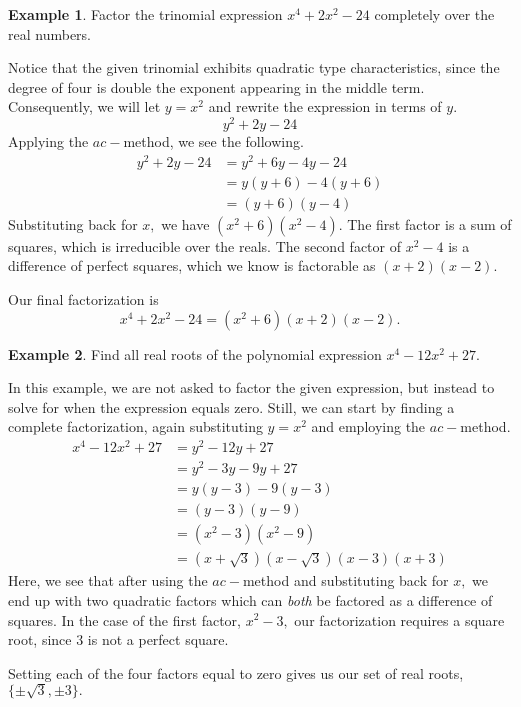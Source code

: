 \documentclass[12pt]{book}
\theoremstyle{definition}
\newtheorem{example}{Example}
\begin{document}
\begin{example}\label{quad_type_1} Factor the trinomial expression $x^4+2x^2-24$ completely over the real numbers.
\par
Notice that the given trinomial exhibits quadratic type characteristics, since the degree of four is double the exponent appearing in the middle term.  Consequently, we will let $y=x^2$ and rewrite the expression in terms of $y$.
$$y^2+2y-24$$
Applying the $ac-$method, we see the following.
\begin{equation*}
\begin{split}
y^2+2y-24 & = y^2+6y-4y-24\\
&=y\left(y+6\right)-4\left(y+6\right)\\
&=\left(y+6\right)\left(y-4\right)
\end{split}
\end{equation*}
Substituting back for $x,$ we have $\left(x^2+6\right)\left(x^2-4\right)$.  The first factor is a sum of squares, which is irreducible over the reals.  The second factor of $x^2-4$ is a difference of perfect squares, which we know is factorable as $\left(x+2\right)\left(x-2\right)$.
\par
Our final factorization is
$$x^4+2x^2-24=\left(x^2+6\right)\left(x+2\right)\left(x-2\right).$$
\end{example}
\begin{example} Find all real roots of the polynomial expression $x^4-12x^2+27$.
\par
In this example, we are not asked to factor the given expression, but instead to solve for when the expression equals zero.  Still, we can start by finding a complete factorization, again substituting $y=x^2$ and employing the $ac-$method.
\begin{equation*}
\begin{split}
x^4-12x^2+27 &= y^2-12y+27\\
&=y^2-3y-9y+27\\
&=y\left(y-3\right)-9\left(y-3\right)\\
&=\left(y-3\right)\left(y-9\right)\\
&=\left(x^2-3\right)\left(x^2-9\right)\\
&=\left(x+\sqrt{3}\right)\left(x-\sqrt{3}\right)\left(x-3\right)\left(x+3\right)
\end{split}
\end{equation*}
Here, we see that after using the $ac-$method and substituting back for $x,$ we end up with two quadratic factors which can {\it both} be factored as a difference of squares.  In the case of the first factor, $x^2-3,$ our factorization requires a square root, since $3$ is not a perfect square.
\par
Setting each of the four factors equal to zero gives us our set of real roots, $\{\pm\sqrt{3}, \pm 3\}.$
\end{example}
\end{document}
